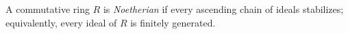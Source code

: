 
A commutative ring $R$ is \emph{Noetherian} if every ascending chain of ideals stabilizes; equivalently, every ideal of $R$ is finitely generated.
